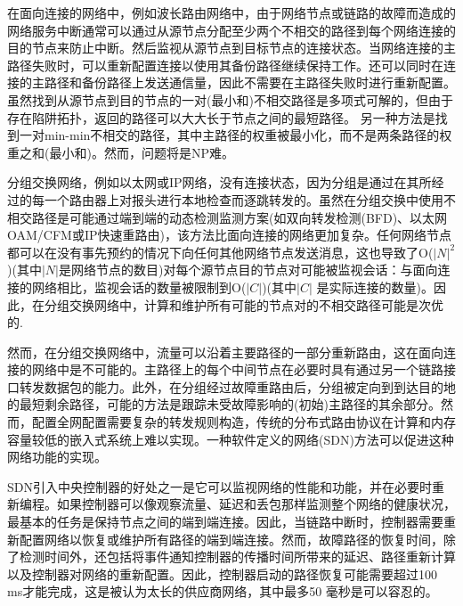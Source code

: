 在面向连接的网络中，例如波长路由网络中，由于网络节点或链路的故障而造成的网络服务中断通常可以通过从源节点分配至少两个不相交的路径到每个网络连接的目的节点来防止中断\cite{kuipers2012overview}。然后监视从源节点到目标节点的连接状态。当网络连接的主路径失败时，可以重新配置连接以使用其备份路径继续保持工作。还可以同时在连接的主路径和备份路径上发送通信量，因此不需要在主路径失败时进行重新配置。虽然找到从源节点到目的节点的一对(最小和)不相交路径是多项式可解的\cite{suurballe1974disjoint,suurballe1984quick}，但由于存在陷阱拓扑\cite{dunn1994comparison}，返回的路径可以大大长于节点之间的最短路径\cite{dunn1994comparison}。 另一种方法是找到一对min-min不相交的路径，其中主路径的权重被最小化，而不是两条路径的权重之和(最小和)。然而，问题将是NP难\cite{guo2013finding}。

分组交换网络，例如以太网或IP网络，没有连接状态，因为分组是通过在其所经过的每一个路由器上对报头进行本地检查而逐跳转发的。虽然在分组交换中使用不相交路径是可能通过端到端的动态检测监测方案(如双向转发检测(BFD)\cite{katz2010bidirectional}、以太网OAM/CFM\cite{mcfarland2005ethernet}或IP快速重路由\cite{shand2010ip})，该方法比面向连接的网络更加复杂。任何网络节点都可以在没有事先预约的情况下向任何其他网络节点发送消息，这也导致了O($|N|^2$)(其中$|N|$是网络节点的数目)对每个源节点目的节点对可能被监视会话：与面向连接的网络相比，监视会话的数量被限制到O($|C|$)(其中$|C|$ 是实际连接的数量)。因此，在分组交换网络中，计算和维护所有可能的节点对的不相交路径可能是次优的.

然而，在分组交换网络中，流量可以沿着主要路径的一部分重新路由，这在面向连接的网络中是不可能的。主路径上的每个中间节点在必要时具有通过另一个链路接口转发数据包的能力。此外，在分组经过故障重路由后，分组被定向到到达目的地的最短剩余路径，可能的方法是跟踪未受故障影响的(初始)主路径的其余部分。然而，配置全网配置需要复杂的转发规则构造，传统的分布式路由协议在计算和内存容量较低的嵌入式系统上难以实现。一种软件定义的网络(SDN)方法可以促进这种网络功能的实现。

SDN引入中央控制器的好处之一是它可以监视网络的性能和功能，并在必要时重新编程。如果控制器可以像观察流量、延迟和丢包那样监测整个网络的健康状况\cite{van2014opennetmon}，最基本的任务是保持节点之间的端到端连接。因此，当链路中断时，控制器需要重新配置网络以恢复或维护所有路径的端到端连接。然而，故障路径的恢复时间，除了检测时间外，还包括将事件通知控制器的传播时间所带来的延迟、路径重新计算以及控制器对网络的重新配置。因此，控制器启动的路径恢复可能需要超过100 ms才能完成，这是被认为太长的供应商网络，其中最多50 毫秒是可以容忍的\cite{niven2009requirements}。






